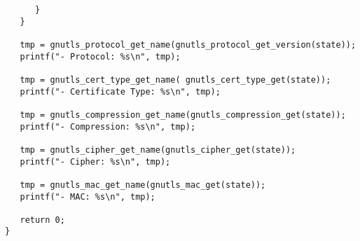 \begin{verbatim}
      }
   }

   tmp = gnutls_protocol_get_name(gnutls_protocol_get_version(state));
   printf("- Protocol: %s\n", tmp);

   tmp = gnutls_cert_type_get_name( gnutls_cert_type_get(state));
   printf("- Certificate Type: %s\n", tmp);

   tmp = gnutls_compression_get_name(gnutls_compression_get(state));
   printf("- Compression: %s\n", tmp);

   tmp = gnutls_cipher_get_name(gnutls_cipher_get(state));
   printf("- Cipher: %s\n", tmp);

   tmp = gnutls_mac_get_name(gnutls_mac_get(state));
   printf("- MAC: %s\n", tmp);

   return 0;
}

\end{verbatim}
